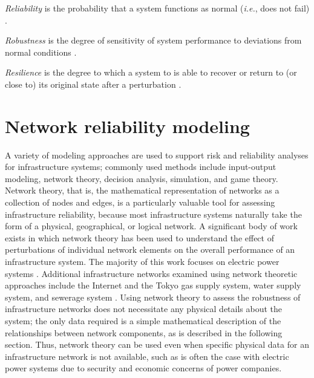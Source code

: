 \begin{defn}
\emph{Reliability} is the probability that a system functions as normal (\emph{i.e.}, does not fail) \cite{Aven2008}.
\end{defn}

\begin{defn}
\emph{Robustness} is the degree of sensitivity of system performance to deviations from normal conditions \cite{Aven2008}.
\end{defn}

\begin{defn}
\emph{Resilience} is the degree to which a system to is able to recover or return to (or close to) its original state after a perturbation \cite{Hansson2003}.
\end{defn}


\section{Network reliability modeling}
\label{sec:ch1:networkreliability}

A variety of modeling approaches are used to support risk and reliability analyses for infrastructure systems; commonly used methods include input-output modeling, network theory, decision analysis, simulation, and game theory.  Network theory, that is, the mathematical representation of networks as a collection of nodes and edges, is a particularly valuable tool for assessing infrastructure reliability, because most infrastructure systems naturally take the form of a physical, geographical, or logical network. A significant body of work exists in which network theory has been used to understand the effect of perturbations of individual network elements on the overall performance of an infrastructure system.  The majority of this work focuses on electric power systems \cite{Albert2004,Crucitti2004a,Crucitti2004b,Holmgren2006a,Holmgren2006b,Kinney2005,Motter2002a,Rosas-Casals2007,Shoji2009,Winkler2010}.  Additional infrastructure networks examined using network theoretic approaches include the Internet \cite{Crucitti2004a,Motter2002a} and the Tokyo gas supply system, water supply system, and sewerage system \cite{Shoji2009}.  Using network theory to assess the robustness of infrastructure networks does not necessitate any physical details about the system; the only data required is a simple mathematical description of the relationships between network components, as is described in the following section.  Thus, network theory can be used even when specific physical data for an infrastructure network is not available, such as is often the case with electric power systems due to security and economic concerns of power companies.

